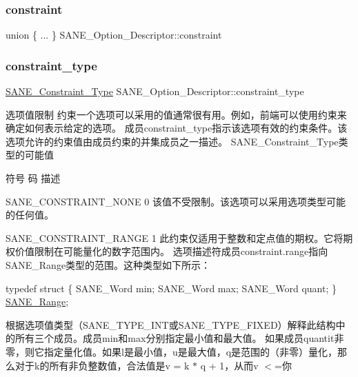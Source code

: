 \subsubsection{\texorpdfstring{constraint}{constraint}}
{\footnotesize\ttfamily union \{ ... \} 
     S\+A\+N\+E\+\_\+\+Option\+\_\+\+Descriptor\+::constraint}

\mbox{\label{structSANE__Option__Descriptor_a10767a0944d00b3dad2de45086512e76}} 
\subsubsection{\texorpdfstring{constraint\+\_\+type}{constraint\_type}}
{\footnotesize\ttfamily \hyperlink{sane_8h_a6422f68f593477ab1fd81078e9afc8e9}{S\+A\+N\+E\+\_\+\+Constraint\+\_\+\+Type} S\+A\+N\+E\+\_\+\+Option\+\_\+\+Descriptor\+::constraint\+\_\+type}

选项值限制 约束一个选项可以采用的值通常很有用。例如，前端可以使用约束来确定如何表示给定的选项。 成员constraint\+\_\+type指示该选项有效的约束条件。该选项允许的约束值由成员约束的并集成员之一描述。 S\+A\+N\+E\+\_\+\+Constraint\+\_\+\+Type类型的可能值

符号 码 描述

S\+A\+N\+E\+\_\+\+C\+O\+N\+S\+T\+R\+A\+I\+N\+T\+\_\+\+N\+O\+NE 0 该值不受限制。该选项可以采用选项类型可能的任何值。

S\+A\+N\+E\+\_\+\+C\+O\+N\+S\+T\+R\+A\+I\+N\+T\+\_\+\+R\+A\+N\+GE 1 此约束仅适用于整数和定点值的期权。它将期权价值限制在可能量化的数字范围内。 选项描述符成员constraint.\+range指向\+S\+A\+N\+E\+\_\+\+Range类型的范围。这种类型如下所示：

typedef struct \{ S\+A\+N\+E\+\_\+\+Word min; S\+A\+N\+E\+\_\+\+Word max; S\+A\+N\+E\+\_\+\+Word quant; \} \hyperlink{structSANE__Range}{S\+A\+N\+E\+\_\+\+Range};

根据选项值类型（\+S\+A\+N\+E\+\_\+\+T\+Y\+P\+E\+\_\+\+I\+N\+T或\+S\+A\+N\+E\+\_\+\+T\+Y\+P\+E\+\_\+\+F\+I\+X\+E\+D）解释此结构中的所有三个成员。成员min和max分别指定最小值和最大值。 如果成员quantit非零，则它指定量化值。如果l是最小值，u是最大值，q是范围的（非零）量化，那么对于k的所有非负整数值，合法值是v = k $\ast$ q + 1，从而v $<$=你

